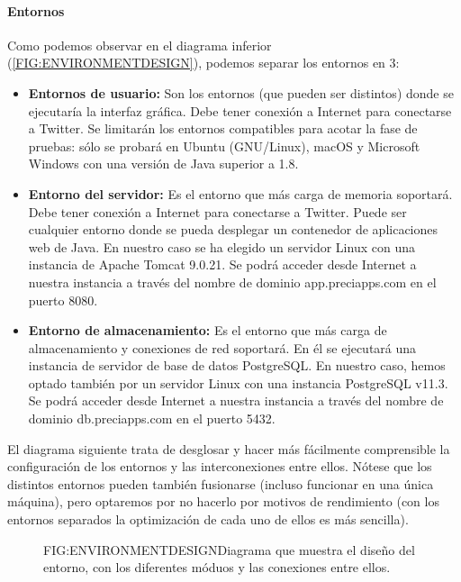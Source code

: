 \paragraph{Entornos}
Como podemos observar en el diagrama inferior (\ref{FIG:ENVIRONMENTDESIGN}), podemos separar los entornos en 3:
\begin{itemize}
	\item \textbf{Entornos de usuario:} Son los entornos (que pueden ser distintos) donde se ejecutaría la interfaz gráfica. Debe tener conexión a Internet para conectarse a Twitter. Se limitarán los entornos compatibles para acotar la fase de pruebas: sólo se probará en Ubuntu (GNU/Linux), macOS y Microsoft Windows con una versión de Java superior a 1.8.
	\item \textbf{Entorno del servidor:} Es el entorno que más carga de memoria soportará. Debe tener conexión a Internet para conectarse a Twitter. Puede ser cualquier entorno donde se pueda desplegar un contenedor de aplicaciones web de Java. En nuestro caso se ha elegido un servidor Linux con una instancia de Apache Tomcat 9.0.21. Se podrá acceder desde Internet a nuestra instancia a través del nombre de dominio app.preciapps.com en el puerto 8080. \newpage
	\item \textbf{Entorno de almacenamiento:} Es el entorno que más carga de almacenamiento y conexiones de red soportará. En él se ejecutará una instancia de servidor de base de datos PostgreSQL. En nuestro caso, hemos optado también por un servidor Linux con una instancia PostgreSQL v11.3. Se podrá acceder desde Internet a nuestra instancia a través del nombre de dominio db.preciapps.com en el puerto 5432.
\end{itemize}
El diagrama siguiente trata de desglosar y hacer más fácilmente comprensible la configuración de los entornos y las interconexiones entre ellos. Nótese que los distintos entornos pueden también fusionarse (incluso funcionar en una única máquina), pero optaremos por no hacerlo por motivos de rendimiento (con los entornos separados la optimización de cada uno de ellos es más sencilla). 
\begin{figure}[Diseño del entorno]{FIG:ENVIRONMENTDESIGN}{Diagrama que muestra el diseño del entorno, con los diferentes móduos y las conexiones entre ellos.}
\end{figure}
\newpage
